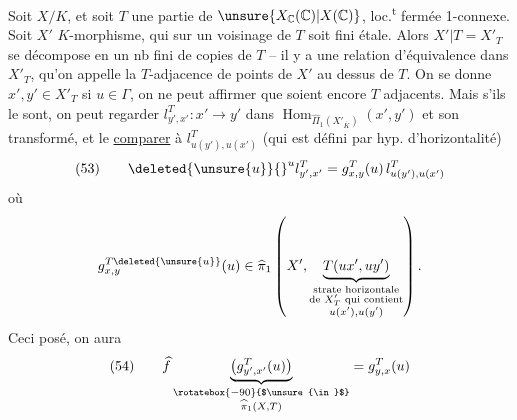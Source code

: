 \hrulefill

Soit $X/K$, et soit $T$ une partie de $\unsure{X_{\mathbb C}(\mathbb C)|X(\mathbb C)}$, loc.\textsuperscript{t} fermée 1-connexe. Soit $X'$  $K$-morphisme, qui sur  un voisinage de $T$ soit fini étale. Alors $X'\vert T=X'_T$ se décompose en un nb fini de copies de $T$ -- il y a une relation d'équivalence dans $X'_T$, qu'on appelle la $T$-adjacence de points de $X'$ au dessus de $T$. On se donne  $x',y'\in X'_T$  si $u\in\Gamma$, on ne peut affirmer que  soient encore $T$ adjacents.
Mais s'ils le sont, on peut regarder $l^T_{y',x'}:x'\to y'$  dans  $\operatorname{Hom}_{\widehat{\Pi}_1(X'_{\overline K})}(x',y')$ et son transformé,   et le \uline{comparer}  à $l^T_{u(y'),u(x')}$ (qui est défini par hyp. d'horizontalité)
\[
(53)\qquad \deleted{\unsure{u}}{}^u l^T_{y',x'}=g^T_{x,y}(u)\,l^T_{u(y'),u(x')}
\]
où
\[
g^{T\deleted{\unsure{u}}}_{x,y}(u)\in\widehat{\pi}_1\left(X',\underbrace{T(u x',u y')}_{\substack{\text{strate horizontale}\\\text{de }X'_T\text{ qui contient}\\u(x'),u(y')}}\right).
\]
Ceci posé, on aura
\[
(54)\qquad \widehat f\underbrace{\bigl(g^T_{y',x'}(u)\bigr)}_{\substack{\rotatebox{-90}{$\unsure{\in}$}\\\widehat{\pi}_1(X,T)}}=g^T_{y,x}(u)
\]
